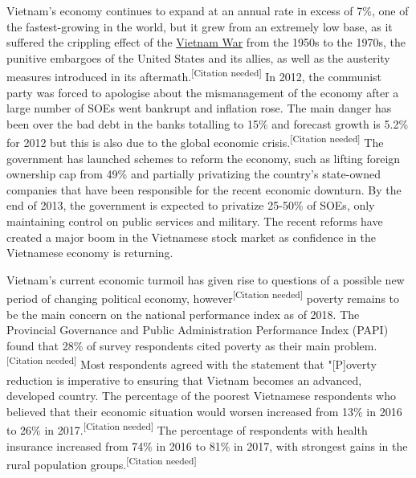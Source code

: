 \documentclass[openany]{book}
\begin{document}
Vietnam's economy continues to expand at an annual rate in excess of 7\%, one of the fastest-growing in the world, but it grew from an extremely low base, as it suffered the crippling effect of the \href{https://en.wikipedia.org/wiki/Vietnam_War}{Vietnam War} from the 1950s to the 1970s, the punitive embargoes of the United States and its allies, as well as the austerity measures introduced in its aftermath.\textsuperscript{[Citation needed]} In 2012, the communist party was forced to apologise about the mismanagement of the economy after a large number of SOEs went bankrupt and inflation rose. The main danger has been over the bad debt in the banks totalling to 15\% and forecast growth is 5.2\% for 2012 but this is also due to the global economic crisis.\textsuperscript{[Citation needed]} The government has launched schemes to reform the economy, such as lifting foreign ownership cap from 49\% and partially privatizing the country's state-owned companies that have been responsible for the recent economic downturn. By the end of 2013, the government is expected to privatize 25-50\% of SOEs, only maintaining control on public services and military. The recent reforms have created a major boom in the Vietnamese stock market as confidence in the Vietnamese economy is returning.

Vietnam's current economic turmoil has given rise to questions of a possible new period of changing political economy, however\textsuperscript{[Citation needed]} poverty remains to be the main concern on the national performance index as of 2018. The Provincial Governance and Public Administration Performance Index (PAPI) found that 28\% of survey respondents cited poverty as their main problem.\textsuperscript{[Citation needed]} Most respondents agreed with the statement that "[P]overty reduction is imperative to ensuring that Vietnam becomes an advanced, developed country. The percentage of the poorest Vietnamese respondents who believed that their economic situation would worsen increased from 13\% in 2016 to 26\% in 2017.\textsuperscript{[Citation needed]} The percentage of respondents with health insurance increased from 74\% in 2016 to 81\% in 2017, with strongest gains in the rural population groups.\textsuperscript{[Citation needed]}
\end{document}
